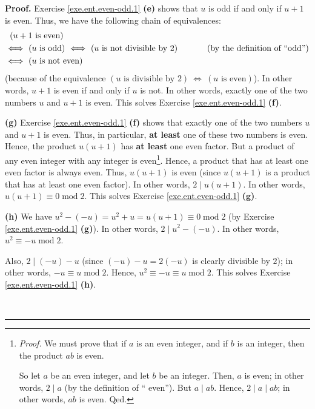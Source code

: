 \documentclass[numbers=enddot,12pt,final,onecolumn,notitlepage]{scrartcl}%
\numberwithin{exer}{subsection}
\theoremstyle{definition}
\newenvironment{fineprint}{\begin{small}}{\end{small}}
\newenvironment{proof}[1][Proof]{\noindent\textbf{#1.} }{\ \rule{0.5em}{0.5em}}
\begin{document}
\begin{fineprint}
\begin{proof}
Exercise \ref{exe.ent.even-odd.1} \textbf{(e)} shows that $u$ is odd if and
only if $u+1$ is even. Thus, we have the following chain of equivalences:%
\begin{align*}
&  \ \left(  u+1\text{ is even}\right) \\
&  \Longleftrightarrow\ \left(  u\text{ is odd}\right)  \ \Longleftrightarrow
\ \left(  u\text{ is not divisible by }2\right)  \ \ \ \ \ \ \ \ \ \ \left(
\text{by the definition of \textquotedblleft odd\textquotedblright}\right) \\
&  \Longleftrightarrow\ \left(  u\text{ is not even}\right)
\end{align*}
(because of the equivalence $\left(  u\text{ is divisible by }2\right)
\ \Longleftrightarrow\ \left(  u\text{ is even}\right)  $). In other words,
$u+1$ is even if and only if $u$ is not. In other words, exactly one of the
two numbers $u$ and $u+1$ is even. This solves Exercise
\ref{exe.ent.even-odd.1} \textbf{(f)}.

\textbf{(g)} Exercise \ref{exe.ent.even-odd.1} \textbf{(f)} shows that exactly
one of the two numbers $u$ and $u+1$ is even. Thus, in particular, \textbf{at
least} one of these two numbers is even. Hence, the product $u\left(
u+1\right)  $ has \textbf{at least} one even factor. But a product of any even
integer with any integer is even\footnote{\textit{Proof.} We must prove that
if $a$ is an even integer, and if $b$ is an integer, then the product $ab$ is
even.
\par
So let $a$ be an even integer, and let $b$ be an integer. Then, $a$ is even;
in other words, $2\mid a$ (by the definition of \textquotedblleft
even\textquotedblright). But $a\mid ab$. Hence, $2\mid a\mid ab$; in other
words, $ab$ is even. Qed.}. Hence, a product that has at least one even factor
is always even. Thus, $u\left(  u+1\right)  $ is even (since $u\left(
u+1\right)  $ is a product that has at least one even factor). In other words,
$2\mid u\left(  u+1\right)  $. In other words, $u\left(  u+1\right)
\equiv0\operatorname{mod}2$. This solves Exercise \ref{exe.ent.even-odd.1}
\textbf{(g)}.

\textbf{(h)} We have $u^{2}-\left(  -u\right)  =u^{2}+u=u\left(  u+1\right)
\equiv0\operatorname{mod}2$ (by Exercise \ref{exe.ent.even-odd.1}
\textbf{(g)}). In other words, $2\mid u^{2}-\left(  -u\right)  $. In other
words, $u^{2}\equiv-u\operatorname{mod}2$.

Also, $2\mid\left(  -u\right)  -u$ (since $\left(  -u\right)  -u=2\left(
-u\right)  $ is clearly divisible by $2$); in other words, $-u\equiv
u\operatorname{mod}2$. Hence, $u^{2}\equiv-u\equiv u\operatorname{mod}2$. This
solves Exercise \ref{exe.ent.even-odd.1} \textbf{(h)}.


\end{proof}
\end{fineprint}
\end{document}
